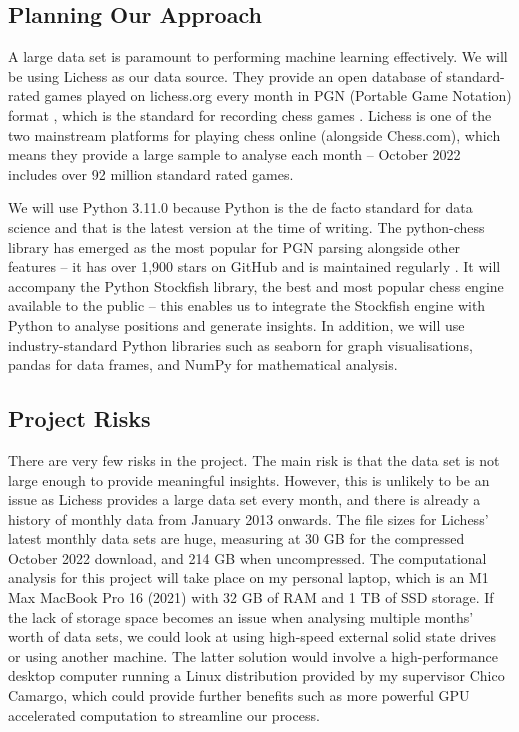 \documentclass[%
 superscriptaddress,
showpacs,preprintnumbers,
 amsmath,
 amssymb,
 aps,
 pra,
showkeys,
onecolumn,
notitlepage,
11pt,
tightenlines      %
]{revtex4-1}
\begin{document}
\subsection{Planning Our Approach}
A large data set is paramount to performing machine learning effectively. We will be using Lichess as our data source. They provide an open database of standard-rated games played on lichess.org every month in PGN (Portable Game Notation) format \cite{lichessOpenDatabase}, which is the standard for recording chess games \cite{pgnExplanation}. Lichess is one of the two mainstream platforms for playing chess online (alongside Chess.com), which means they provide a large sample to analyse each month -- October 2022 includes over 92 million standard rated games.

We will use Python 3.11.0 because Python is the de facto standard for data science \cite{pythonForDataScience} and that is the latest version at the time of writing. The python-chess library has emerged as the most popular for PGN parsing alongside other features -- it has over 1,900 stars on GitHub and is maintained regularly \cite{pythonChessLibrary}. It will accompany the Python Stockfish library, the best and most popular chess engine available to the public \cite{aboutStockfish} -- this enables us to integrate the Stockfish engine with Python to analyse positions and generate insights. In addition, we will use industry-standard Python libraries such as seaborn for graph visualisations, pandas for data frames, and NumPy for mathematical analysis.

\subsection{Project Risks}
There are very few risks in the project. The main risk is that the data set is not large enough to provide meaningful insights. However, this is unlikely to be an issue as Lichess provides a large data set every month, and there is already a history of monthly data from January 2013 onwards. The file sizes for Lichess' latest monthly data sets are huge, measuring at 30 GB for the compressed October 2022 download, and 214 GB when uncompressed. The computational analysis for this project will take place on my personal laptop, which is an M1 Max MacBook Pro 16 (2021) with 32 GB of RAM and 1 TB of SSD storage. If the lack of storage space becomes an issue when analysing multiple months' worth of data sets, we could look at using high-speed external solid state drives or using another machine. The latter solution would involve a high-performance desktop computer running a Linux distribution provided by my supervisor Chico Camargo, which could provide further benefits such as more powerful GPU accelerated computation to streamline our process.
\end{document}
